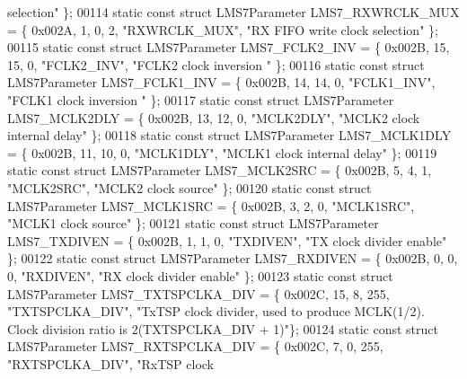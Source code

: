 \begin{DoxyCode}
{       selection"} \};
00114 \textcolor{keyword}{static} \textcolor{keyword}{const} \textcolor{keyword}{struct }LMS7Parameter LMS7_RXWRCLK_MUX = \{ 0x002A, 1, 0, 2, \textcolor{stringliteral}{"RXWRCLK\_MUX"}, \textcolor{stringliteral}{"RX FIFO write clock
       selection"} \};
00115 \textcolor{keyword}{static} \textcolor{keyword}{const} \textcolor{keyword}{struct }LMS7Parameter LMS7_FCLK2_INV = \{ 0x002B, 15, 15, 0, \textcolor{stringliteral}{"FCLK2\_INV"}, \textcolor{stringliteral}{"FCLK2 clock inversion
      "} \};
00116 \textcolor{keyword}{static} \textcolor{keyword}{const} \textcolor{keyword}{struct }LMS7Parameter LMS7_FCLK1_INV = \{ 0x002B, 14, 14, 0, \textcolor{stringliteral}{"FCLK1\_INV"}, \textcolor{stringliteral}{"FCLK1 clock inversion
      "} \};
00117 \textcolor{keyword}{static} \textcolor{keyword}{const} \textcolor{keyword}{struct }LMS7Parameter LMS7_MCLK2DLY = \{ 0x002B, 13, 12, 0, \textcolor{stringliteral}{"MCLK2DLY"}, \textcolor{stringliteral}{"MCLK2 clock internal
       delay"} \};
00118 \textcolor{keyword}{static} \textcolor{keyword}{const} \textcolor{keyword}{struct }LMS7Parameter LMS7_MCLK1DLY = \{ 0x002B, 11, 10, 0, \textcolor{stringliteral}{"MCLK1DLY"}, \textcolor{stringliteral}{"MCLK1 clock internal
       delay"} \};
00119 \textcolor{keyword}{static} \textcolor{keyword}{const} \textcolor{keyword}{struct }LMS7Parameter LMS7_MCLK2SRC = \{ 0x002B, 5, 4, 1, \textcolor{stringliteral}{"MCLK2SRC"}, \textcolor{stringliteral}{"MCLK2 clock source"} \};
00120 \textcolor{keyword}{static} \textcolor{keyword}{const} \textcolor{keyword}{struct }LMS7Parameter LMS7_MCLK1SRC = \{ 0x002B, 3, 2, 0, \textcolor{stringliteral}{"MCLK1SRC"}, \textcolor{stringliteral}{"MCLK1 clock source"} \};
00121 \textcolor{keyword}{static} \textcolor{keyword}{const} \textcolor{keyword}{struct }LMS7Parameter LMS7_TXDIVEN = \{ 0x002B, 1, 1, 0, \textcolor{stringliteral}{"TXDIVEN"}, \textcolor{stringliteral}{"TX clock divider enable"} \};
00122 \textcolor{keyword}{static} \textcolor{keyword}{const} \textcolor{keyword}{struct }LMS7Parameter LMS7_RXDIVEN = \{ 0x002B, 0, 0, 0, \textcolor{stringliteral}{"RXDIVEN"}, \textcolor{stringliteral}{"RX clock divider enable"} \};
00123 \textcolor{keyword}{static} \textcolor{keyword}{const} \textcolor{keyword}{struct }LMS7Parameter LMS7_TXTSPCLKA_DIV = \{ 0x002C, 15, 8, 255, \textcolor{stringliteral}{"TXTSPCLKA\_DIV"}, \textcolor{stringliteral}{"TxTSP clock
       divider, used to produce MCLK(1/2). Clock division ratio is 2(TXTSPCLKA\_DIV + 1)"}\};
00124 \textcolor{keyword}{static} \textcolor{keyword}{const} \textcolor{keyword}{struct }LMS7Parameter LMS7_RXTSPCLKA_DIV = \{ 0x002C, 7, 0, 255, \textcolor{stringliteral}{"RXTSPCLKA\_DIV"}, \textcolor{stringliteral}{"RxTSP clock
}
\end{DoxyCode}
